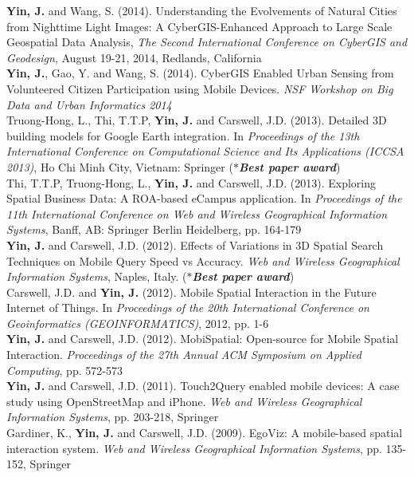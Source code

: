 \documentclass[11pt, a4paper]{article}
\newcommand{\years}[1]{\marginnote{\scriptsize #1}}
\begin{document}
\years{2014}\textbf{Yin, J.} and Wang, S. (2014). Understanding the Evolvements of Natural Cities from Nighttime Light Images: A CyberGIS-Enhanced Approach to Large Scale Geospatial Data Analysis, \textit{The Second International Conference on CyberGIS and Geodesign}, August 19-21, 2014, Redlands, California\\
\years{2014}\textbf{Yin, J.}, Gao, Y. and Wang, S. (2014). CyberGIS Enabled Urban Sensing from Volunteered Citizen Participation using Mobile Devices. \textit{NSF Workshop on Big Data and Urban Informatics 2014}\\
\years{2013}Truong-Hong, L., Thi, T.T.P, \textbf{Yin, J.} and Carswell, J.D. (2013). Detailed 3D building models for Google Earth integration. In \textit{Proceedings of the 13th International Conference on Computational Science and Its Applications (ICCSA 2013)}, Ho Chi Minh City, Vietnam: Springer (\textbf{\emph{$*$Best paper award}})\\
\years{2013}Thi, T.T.P, Truong-Hong, L., \textbf{Yin, J.} and Carswell, J.D. (2013). Exploring Spatial Business Data: A ROA-based eCampus application. In \textit{Proceedings of the 11th International Conference on Web and Wireless Geographical Information Systems}, Banff, AB: Springer Berlin Heidelberg, pp. 164-179\\
\years{2012}\textbf{Yin, J.} and Carswell, J.D. (2012). Effects of Variations in 3D Spatial Search Techniques on Mobile Query Speed vs Accuracy. \textit{Web and Wireless Geographical Information Systems}, Naples, Italy. (\textbf{\emph{$*$Best paper award}})\\
\years{2012}Carswell, J.D. and \textbf{Yin, J.} (2012). Mobile Spatial Interaction in the Future Internet of Things. In \textit{Proceedings of the 20th International Conference on Geoinformatics (GEOINFORMATICS)}, 2012, pp. 1-6\\
\years{2012}\textbf{Yin, J.} and Carswell, J.D. (2012). MobiSpatial: Open-source for Mobile Spatial Interaction. \textit{Proceedings of the 27th Annual ACM Symposium on Applied Computing}, pp. 572-573\\
\years{2011}\textbf{Yin, J.} and Carswell, J.D. (2011). Touch2Query enabled mobile devices: A case study using OpenStreetMap and iPhone. \textit{Web and Wireless Geographical Information Systems}, pp. 203-218, Springer\\
\years{2009} Gardiner, K., \textbf{Yin, J.} and Carswell, J.D. (2009). EgoViz: A mobile-based spatial interaction system. \textit{Web and Wireless Geographical Information Systems}, pp. 135-152, Springer
\end{document}
